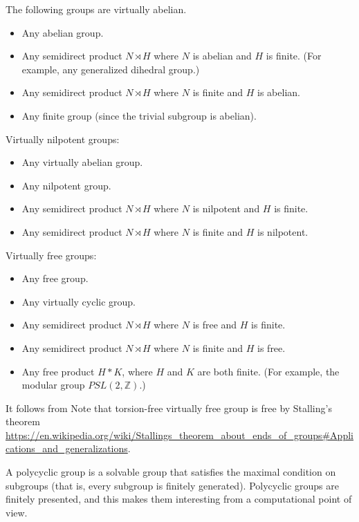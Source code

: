 \begin{example}
The following groups are virtually abelian.
\begin{itemize}
	\item Any abelian group.
	\item Any semidirect product $N\rtimes H$ where $N$ is abelian and $H$ is finite. (For example, any generalized dihedral group.)
	\item Any semidirect product $N\rtimes H$ where $N$ is finite and $H$ is abelian.
	\item Any finite group (since the trivial subgroup is abelian).
\end{itemize}
Virtually nilpotent groups:
\begin{itemize}
	\item Any virtually abelian group.
	\item Any nilpotent group.
	\item Any semidirect product $N\rtimes H$ where $N$ is nilpotent and $H$ is finite.
	\item Any semidirect product $N\rtimes H$ where $N$ is finite and $H$ is nilpotent.
\end{itemize}
Virtually free groups:
\begin{itemize}
	\item  Any free group.
	\item Any virtually cyclic group.
	\item Any semidirect product $N\rtimes H$ where $N$ is free and $H$ is finite.
	\item Any semidirect product $N\rtimes H$ where $N$ is finite and $H$ is free.
	\item Any free product $H * K$, where $H$ and $K$ are both finite. (For example, the modular group $PSL(2,\mathbb{Z})$.)
\end{itemize}
It follows from  Note that torsion-free virtually free group is free by Stalling's theorem \url{https://en.wikipedia.org/wiki/Stallings_theorem_about_ends_of_groups#Applications_and_generalizations}.
\end{example}
A polycyclic group is a solvable group that satisfies the maximal condition on subgroups (that is, every subgroup is finitely generated). Polycyclic groups are finitely presented, and this makes them interesting from a computational point of view.
